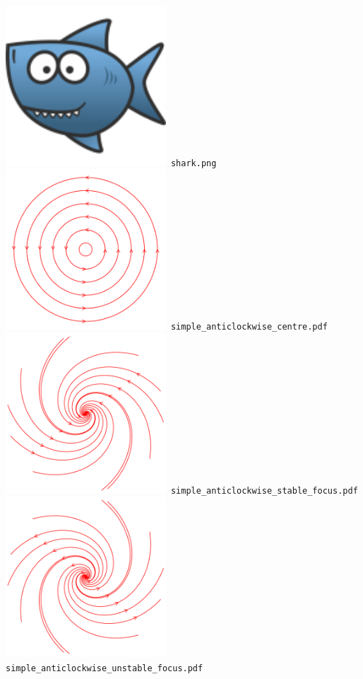 \documentclass[a4paper]{amsart}
\begin{document}
\includegraphics[width=6cm]{shark.png}\verb+ shark.png+\\
\includegraphics[width=6cm]{simple_anticlockwise_centre.pdf}\verb+ simple_anticlockwise_centre.pdf+\\
\includegraphics[width=6cm]{simple_anticlockwise_stable_focus.pdf}\verb+ simple_anticlockwise_stable_focus.pdf+\\
\includegraphics[width=6cm]{simple_anticlockwise_unstable_focus.pdf}\verb+ simple_anticlockwise_unstable_focus.pdf+\\
\end{document}
